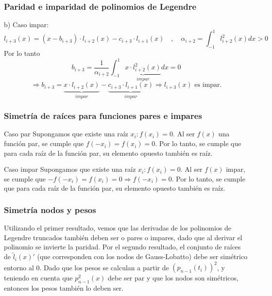 \documentclass{beamer}
\begin{document}

\begin{frame}
\frametitle{Paridad e imparidad de polinomios de Legendre}
b) Caso impar:
\[l_{i+3}(x)=(x-b_{i+3})\cdot l_{i+2}(x)-c_{i+3}\cdot l_{i+1}(x)\quad,\quad\alpha_{i+2}=\int_{-1}^1l_{i+2}^2(x)dx>0\] 
Por lo tanto \[b_{i+3}=\frac{1}{\alpha_{i+2}}\int_{-1}^1\underbrace{x\cdot l_{i+2}^2(x)}_{impar}dx=0\]
\[\Rightarrow b_{i+3}=\underbrace{x\cdot l_{i+2}(x)}_{impar}-\underbrace{c_{i+3}\cdot l_{i+1}(x)}_{impar}\Rightarrow l_{i+3}(x)\text{ es impar.}\]
\end{frame}


\begin{frame} 
\frametitle{Simetría de raíces para funciones pares e impares}
\begin{block}{Caso par} 
Supongamos que existe una raíz $x_i:f(x_i)=0$. Al ser $f(x)$ una función par, se cumple que $f(-x_i)=f(x_i)=0$. Por lo tanto, se cumple que para cada raíz de la función par, su elemento opuesto también es raíz.
\end{block}
\begin{block}{Caso impar} 
Supongamos que existe una raíz $x_i:f(x_i)=0$. Al ser $f(x)$ impar, se cumple que $-f(-x_i)=f(x_i)=0\Rightarrow f(-x_i)=0$. Por lo tanto, se cumple que para cada raíz de la función par, su elemento opuesto también es raíz.
\end{block}
\end{frame}


\begin{frame}
\frametitle{Simetría nodos y pesos}
Utilizando el primer resultado, vemos que las derivadas de los polinomios de Legendre truncados también deben ser o pares o impares, dado que al derivar el polinomio se invierte la paridad. Por el segundo resultado, el conjunto de raíces de $\tilde l_i(x)'$ (que corresponden con los nodos de Gauss-Lobatto) debe ser simétrico entorno al 0. Dado que los pesos se calculan a partir de $(p_{n-1}(t_i))^2$, y teniendo en cuenta que $p_{n-1}^2(x)$ debe ser par y que los nodos son simétricos, entonces los pesos también lo deben ser. 
\end{frame}


\end{document}
